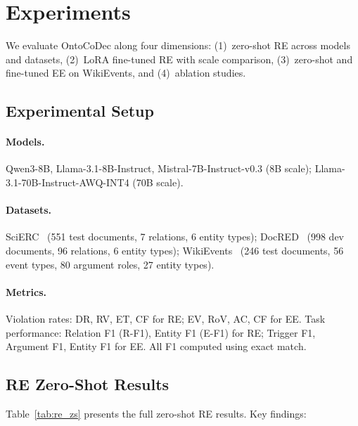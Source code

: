 \documentclass[11pt]{article}
\newcommand{\sys}{OntoCoDec}
\begin{document}
\section{Experiments}
\label{sec:experiments}

We evaluate \sys{} along four dimensions: (1)~zero-shot RE across models and datasets, (2)~LoRA fine-tuned RE with scale comparison, (3)~zero-shot and fine-tuned EE on WikiEvents, and (4)~ablation studies.

\subsection{Experimental Setup}
\paragraph{Models.}
Qwen3-8B, Llama-3.1-8B-Instruct, Mistral-7B-Instruct-v0.3 (8B scale); Llama-3.1-70B-Instruct-AWQ-INT4 (70B scale).

\paragraph{Datasets.}
SciERC~\cite{luan2018multi} (551 test documents, 7 relations, 6 entity types); DocRED~\cite{yao2019docred} (998 dev documents, 96 relations, 6 entity types); WikiEvents~\cite{li2021document} (246 test documents, 56 event types, 80 argument roles, 27 entity types).

\paragraph{Metrics.}
Violation rates: DR, RV, ET, CF for RE; EV, RoV, AC, CF for EE.
Task performance: Relation F1 (R-F1), Entity F1 (E-F1) for RE; Trigger F1, Argument F1, Entity F1 for EE.
All F1 computed using exact match.

\subsection{RE Zero-Shot Results}
\label{sec:re_zs}

Table~\ref{tab:re_zs} presents the full zero-shot RE results.
Key findings:
\end{document}
